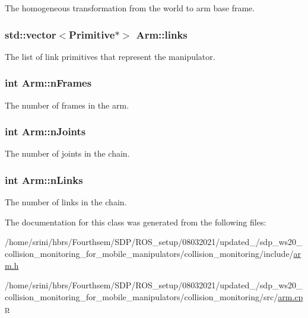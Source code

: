The homogeneous transformation from the world to arm base frame. 

\subsubsection[{\texorpdfstring{links}{links}}]{\setlength{\rightskip}{0pt plus 5cm}std\+::vector$<${\bf Primitive}$\ast$$>$ Arm\+::links}\hypertarget{class_arm_a427fb95641bb8d0886b2849f0bda36be}{}\label{class_arm_a427fb95641bb8d0886b2849f0bda36be}


The list of link primitives that represent the manipulator. 

\subsubsection[{\texorpdfstring{n\+Frames}{nFrames}}]{\setlength{\rightskip}{0pt plus 5cm}int Arm\+::n\+Frames}\hypertarget{class_arm_ac7955a5e8e9c6681b55d0d80d7e31df7}{}\label{class_arm_ac7955a5e8e9c6681b55d0d80d7e31df7}


The number of frames in the arm. 

\subsubsection[{\texorpdfstring{n\+Joints}{nJoints}}]{\setlength{\rightskip}{0pt plus 5cm}int Arm\+::n\+Joints}\hypertarget{class_arm_ac3734a2ca38b0312fd42894ab6886bc9}{}\label{class_arm_ac3734a2ca38b0312fd42894ab6886bc9}


The number of joints in the chain. 

\subsubsection[{\texorpdfstring{n\+Links}{nLinks}}]{\setlength{\rightskip}{0pt plus 5cm}int Arm\+::n\+Links}\hypertarget{class_arm_a911ba9a8c719c090a305f88ab0ae7490}{}\label{class_arm_a911ba9a8c719c090a305f88ab0ae7490}


The number of links in the chain. 



The documentation for this class was generated from the following files\+:\begin{DoxyCompactItemize}
\item 
/home/srini/hbrs/\+Fourthsem/\+S\+D\+P/\+R\+O\+S\+\_\+setup/08032021/updated\+\_/sdp\+\_\+ws20\+\_\+collision\+\_\+monitoring\+\_\+for\+\_\+mobile\+\_\+manipulators/collision\+\_\+monitoring/include/\hyperlink{arm_8h}{arm.\+h}\item 
/home/srini/hbrs/\+Fourthsem/\+S\+D\+P/\+R\+O\+S\+\_\+setup/08032021/updated\+\_/sdp\+\_\+ws20\+\_\+collision\+\_\+monitoring\+\_\+for\+\_\+mobile\+\_\+manipulators/collision\+\_\+monitoring/src/\hyperlink{arm_8cpp}{arm.\+cpp}\end{DoxyCompactItemize}
